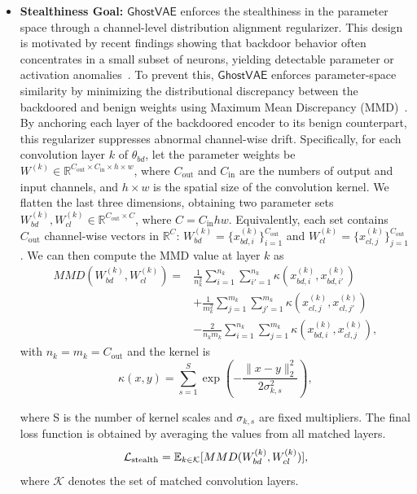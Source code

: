 \documentclass[letterpaper,twocolumn,10pt]{article}
\newcommand{\mg}{$\mathsf{GhostVAE}$\xspace}
\begin{document}
\begin{itemize}
\item \textbf{Stealthiness Goal: }
\mg enforces the stealthiness in the parameter space through a channel-level distribution alignment regularizer.
This design is motivated by recent findings showing that backdoor behavior often concentrates in a small subset of neurons, yielding detectable parameter or activation anomalies~\cite{DBLP:conf/ccs/Xu0KP25,Zhai_2025_ICCV}.
To prevent this, \mg enforces parameter-space similarity by minimizing the distributional discrepancy between the backdoored and benign weights using Maximum Mean Discrepancy (MMD)~\cite{10.5555/2188385.2188410}.
By anchoring each layer of the backdoored encoder to its benign counterpart, this regularizer suppresses abnormal channel-wise drift.
Specifically, for each convolution layer $k$ of $\theta_{bd}$, let the parameter weights be $W^{(k)}\in\mathbb{R}^{C_{\text{out}}\times C_{\text{in}}\times h\times w}$, where $C_{\text{out}}$ and $C_{\text{in}}$ are the numbers of output and input channels, and
$h\times w$ is the spatial size of the convolution kernel.
We flatten the last three dimensions, obtaining two parameter sets
$W_{bd}^{(k)}, W_{{cl}}^{(k)}\in\mathbb{R}^{C_{\mathrm{out}}\times C}$,
where $C=C_{\mathrm{in}}hw$.
Equivalently, each set contains $C_{\mathrm{out}}$ channel-wise vectors in $\mathbb{R}^{C}$:
$W_{bd}^{(k)}=\{x^{(k)}_{{bd},i}\}_{i=1}^{C_{\mathrm{out}}}$ and
$W_{{cl}}^{(k)}=\{x^{(k)}_{{cl},j}\}_{j=1}^{C_{\mathrm{out}}}$.
We can then compute the MMD value at layer $k$ as
\[
\begin{aligned}
MMD(W^{(k)}_{bd},W^{(k)}_{cl})=
&\frac{1}{n_k^2}\sum_{i=1}^{n_k}\sum_{i'=1}^{n_k}
\kappa\!\left(x^{(k)}_{bd,i},x^{(k)}_{bd,i'}\right) \\
&+
\frac{1}{m_k^2}\sum_{j=1}^{m_k}\sum_{j'=1}^{m_k}
\kappa\!\left(x^{(k)}_{cl,j},x^{(k)}_{cl,j'}\right) \\
&-\frac{2}{n_k m_k}\sum_{i=1}^{n_k}\sum_{j=1}^{m_k}
\kappa\!\left(x^{(k)}_{bd,i},x^{(k)}_{cl,j}\right),
\end{aligned}
\]
with $n_k=m_k=C_{\text{out}}$ and the kernel is
\[
\kappa(x,y)=\sum_{s=1}^{S}\exp\!\left(-\frac{\lVert x-y\rVert_2^2}{2\sigma_{k,s}^2}\right),
\]

where S is the number of kernel scales and $\sigma_{k,s}$ are fixed multipliers. 
The final loss function is obtained by averaging the values from all matched layers.
\begin{equation*}
\mathcal{L}_{\rm stealth}=\mathbb{E}_{k\in\mathcal{K}}[MMD(W_{bd}^{(k)},W_{cl}^{(k)})],
\end{equation*}
where $\mathcal{K}$ denotes the set of matched convolution layers.

\end{itemize}
\end{document}
